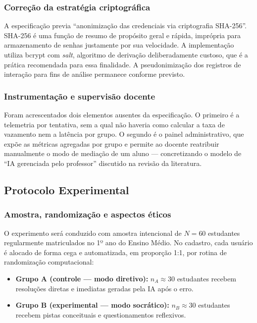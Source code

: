 \documentclass[10pt, a4paper, twocolumn]{article}
\begin{document}
\subsubsection{Correção da estratégia criptográfica}

A especificação previa ``anonimização das credenciais via criptografia
SHA-256''. SHA-256 é uma função de resumo de propósito geral e rápida, imprópria
para armazenamento de senhas justamente por sua velocidade. A implementação
utiliza bcrypt com \textit{salt}, algoritmo de derivação deliberadamente custoso,
que é a prática recomendada para essa finalidade. A pseudonimização dos registros
de interação para fins de análise permanece conforme previsto.

\subsubsection{Instrumentação e supervisão docente}

Foram acrescentados dois elementos ausentes da especificação. O primeiro é a
telemetria por tentativa, sem a qual não haveria como calcular a taxa de
vazamento nem a latência por grupo. O segundo é o painel administrativo, que
expõe as métricas agregadas por grupo e permite ao docente reatribuir
manualmente o modo de mediação de um aluno --- concretizando o modelo de ``IA
gerenciada pelo professor'' discutido na revisão da literatura.

\subsection{Protocolo Experimental}
\label{subsec:experimento}

\subsubsection{Amostra, randomização e aspectos éticos}

O experimento será conduzido com amostra intencional de $N = 60$ estudantes
regularmente matriculados no 1º ano do Ensino Médio. No cadastro, cada usuário é
alocado de forma cega e automatizada, em proporção 1:1, por rotina de
randomização computacional:

\begin{itemize}[leftmargin=0.4cm, itemsep=2pt]
    \item \textbf{Grupo A (controle --- modo diretivo):} $n_A \approx 30$
    estudantes recebem resoluções diretas e imediatas geradas pela IA após o
    erro.
    \item \textbf{Grupo B (experimental --- modo socrático):} $n_B \approx 30$
    estudantes recebem pistas conceituais e questionamentos reflexivos.
\end{itemize}
\end{document}
